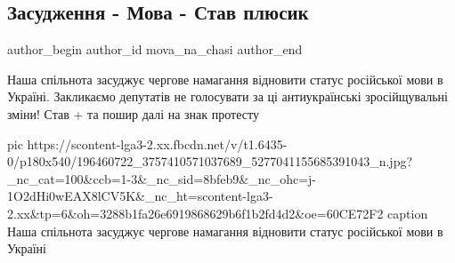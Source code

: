  
 
 
 
 
 
\subsection{Засудження - Мова - Став плюсик}
\label{sec:10_06_2021.fb.mova_na_chasi.1.mova_zasudzhennja}
\ifcmt
 author_begin
   author_id mova_na_chasi
 author_end
\fi

Наша спільнота засуджує чергове намагання відновити статус російської мови в
Україні. Закликаємо депутатів не голосувати за ці антиукраїнські зросійщувальні
зміни!  Став + та пошир далі на знак протесту

\ifcmt
  pic https://scontent-lga3-2.xx.fbcdn.net/v/t1.6435-0/p180x540/196460722_3757410571037689_5277041155685391043_n.jpg?_nc_cat=100&ccb=1-3&_nc_sid=8bfeb9&_nc_ohc=j-1O2dHi0wEAX8lCV5K&_nc_ht=scontent-lga3-2.xx&tp=6&oh=3288b1fa26e6919868629b6f1b2fd4d2&oe=60CE72F2
	caption Наша спільнота засуджує чергове намагання відновити статус російської мови в Україні
\fi
